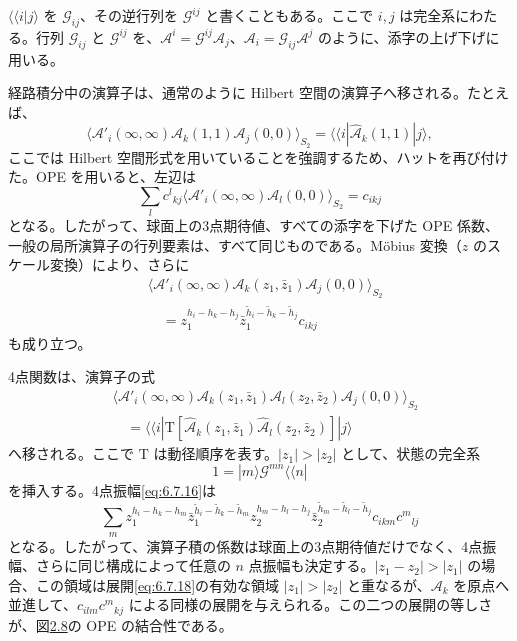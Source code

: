 $\langle\!\langle i|j\rangle$ を $\mathcal G_{ij}$、その逆行列を $\mathcal G^{ij}$ と書くこともある。ここで $i,j$ は完全系にわたる。行列 $\mathcal G_{ij}$ と $\mathcal G^{ij}$ を、$\mathcal A^i=\mathcal G^{ij}\mathcal A_j$、$\mathcal A_i=\mathcal G_{ij}\mathcal A^j$ のように、添字の上げ下げに用いる。

経路積分中の演算子は、通常のように Hilbert 空間の演算子へ移される。たとえば、
\begin{equation}
\langle\mathcal A'_i(\infty,\infty)\mathcal A_k(1,1)\mathcal A_j(0,0)\rangle_{S_2}
=\langle\!\langle i|\widehat{\mathcal A}_k(1,1)|j\rangle,
\tag{6.7.13}\label{eq:6.7.13}
\end{equation}
ここでは Hilbert 空間形式を用いていることを強調するため、ハットを再び付けた。OPE を用いると、左辺は
\begin{equation}
\sum_lc^l{}_{kj}
\langle\mathcal A'_i(\infty,\infty)\mathcal A_l(0,0)\rangle_{S_2}
=c_{ikj}
\tag{6.7.14}\label{eq:6.7.14}
\end{equation}
となる。したがって、球面上の3点期待値、すべての添字を下げた OPE 係数、一般の局所演算子の行列要素は、すべて同じものである。Möbius 変換（$z$ のスケール変換）により、さらに
\begin{equation}
\begin{aligned}
&\langle\mathcal A'_i(\infty,\infty)\mathcal A_k(z_1,\bar z_1)
\mathcal A_j(0,0)\rangle_{S_2}\\
&\quad=z_1^{h_i-h_k-h_j}
\bar z_1^{\widetilde h_i-\widetilde h_k-\widetilde h_j}c_{ikj}
\end{aligned}
\tag{6.7.15}\label{eq:6.7.15}
\end{equation}
も成り立つ。

4点関数は、演算子の式
\begin{equation}
\begin{aligned}
&\langle\mathcal A'_i(\infty,\infty)\mathcal A_k(z_1,\bar z_1)
\mathcal A_l(z_2,\bar z_2)\mathcal A_j(0,0)\rangle_{S_2}\\
&\quad=\langle\!\langle i|\mathrm T[
\widehat{\mathcal A}_k(z_1,\bar z_1)
\widehat{\mathcal A}_l(z_2,\bar z_2)]|j\rangle
\end{aligned}
\tag{6.7.16}\label{eq:6.7.16}
\end{equation}
へ移される。ここで $\mathrm T$ は動径順序を表す。$|z_1|>|z_2|$ として、状態の完全系
\begin{equation}
1=|m\rangle\mathcal G^{mn}\langle\!\langle n|
\tag{6.7.17}\label{eq:6.7.17}
\end{equation}
を挿入する。4点振幅\eqref{eq:6.7.16}は
\begin{equation}
\sum_m z_1^{h_i-h_k-h_m}
\bar z_1^{\widetilde h_i-\widetilde h_k-\widetilde h_m}
z_2^{h_m-h_l-h_j}
\bar z_2^{\widetilde h_m-\widetilde h_l-\widetilde h_j}
c_{ikm}c^m{}_{lj}
\tag{6.7.18}\label{eq:6.7.18}
\end{equation}
となる。したがって、演算子積の係数は球面上の3点期待値だけでなく、4点振幅、さらに同じ構成によって任意の $n$ 点振幅も決定する。$|z_1-z_2|>|z_1|$ の場合、この領域は展開\eqref{eq:6.7.18}の有効な領域 $|z_1|>|z_2|$ と重なるが、$\mathcal A_k$ を原点へ並進して、$c_{ilm}c^m{}_{kj}$ による同様の展開を与えられる。この二つの展開の等しさが、図\hyperref[fig:2.8]{2.8}の OPE の結合性である。

